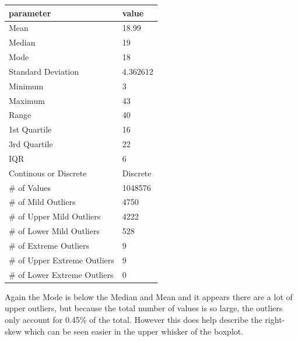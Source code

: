 \documentclass[10pt]{article}
\begin{document}
\begin{table}[h!]
  \begin{center}
    \scriptsize
    \begin{tabular}{ll}
      \toprule
      parameter & value\\
      \midrule
 	Mean & 18.99\\
	Median & 19\\
	Mode & 18\\
	Standard Deviation & 4.362612\\
	Minimum & 3\\
	Maximum & 43\\
	Range & 40\\
	1st Quartile & 16\\
	3rd Quartile & 22\\
	IQR & 6\\   
	Continous or Discrete & Discrete\\
	\# of Values & 1048576\\ 
	\# of Mild Outliers & 4750\\
	\# of Upper Mild Outliers & 4222\\
	\# of Lower Mild Outliers & 528\\
	\# of Extreme Outliers & 9\\
	\# of Upper Extreme Outliers & 9\\
	\# of Lower Extreme Outliers & 0\\
       \bottomrule
    \end{tabular}
  \end{center}
\end{table}

\par
{}%
\hfill
{}%
\par
Again the Mode is below the Median and Mean and it appears there are a lot of upper outliers, but because the total number of values is so large, the outliers only account for 0.45\% of the total. However this does help describe the right-skew which can be seen easier in the upper whisker of the boxplot.
\end{document}
